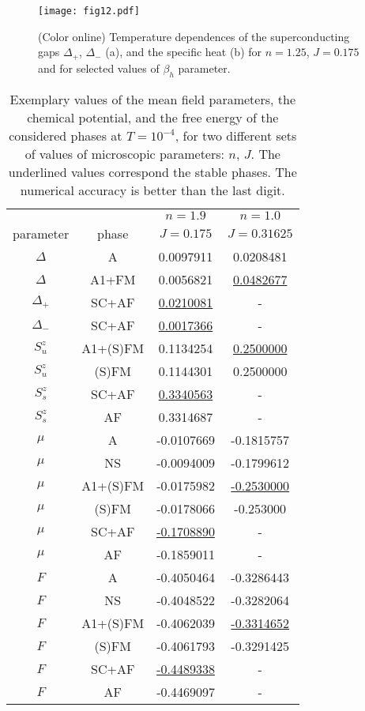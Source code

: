 \documentclass[aps,prb,showpacs,reprint]{revtex4-1}
\begin{document}
\begin{figure}[htpb]
\texttt{[image: fig12.pdf]} 
\caption{(Color online) Temperature dependences of the superconducting gaps $\Delta_+$,
$\Delta_-$ (a), and the specific heat (b) for $n=1.25$, $J=0.175$ and for
selected
values of $\beta_h$ parameter.}
\label{fig:D_c_A}
\end{figure}

\begin{table}[h]
\centering
\caption{Exemplary values of the mean field parameters, the chemical potential,
and the free energy
of the considered phases at $T=10^{-4}$, for two different sets of values of
microscopic parameters: $n$, $J$. The
underlined values correspond the stable phases. The numerical accuracy is better than the last digit.}
 \begin{tabular}{cccc}
  \hline\hline
             &       &  $n=1.9$ & $n=1.0$ \\ 
   parameter & phase &  $J=0.175$ & $J=0.31625$ \\
  \hline
  $\Delta$   &   A   & 0.0097911 & 0.0208481 \\
  $\Delta$   & A1+FM & 0.0056821 & \underline{0.0482677} \\
  $\Delta_+$ & SC+AF & \underline{0.0210081} &     -      \\
  $\Delta_-$ & SC+AF & \underline{0.0017366} &     -     \\
  \hline
  $S^z_u$    &A1+(S)FM& 0.1134254 & \underline{0.2500000}  \\
  $S^z_u$    & (S)FM  & 0.1144301 & 0.2500000  \\
  $S^z_s$    &  SC+AF & \underline{0.3340563} &     -     \\
  $S^z_s$    &   AF   & 0.3314687 &     -     \\
  \hline
  $\mu$     &    A    & -0.0107669& -0.1815757 \\
  $\mu$     &   NS    &-0.0094009 & -0.1799612 \\
  $\mu$     &A1+(S)FM &-0.0175982 & \underline{-0.2530000} \\
  $\mu$     &  (S)FM  &-0.0178066 & -0.253000   \\
  $\mu$     &  SC+AF  &\underline{-0.1708890} & -           \\
  $\mu$     &   AF    &-0.1859011 & -          \\
  \hline
  $F$       &    A    &-0.4050464 & -0.3286443 \\
  $F$       &   NS    &-0.4048522 & -0.3282064 \\
  $F$       &A1+(S)FM &-0.4062039 & \underline{-0.3314652}\\
  $F$       &  (S)FM  &-0.4061793 & -0.3291425 \\
  $F$       &  SC+AF  &\underline{-0.4489338} & -          \\
  $F$       &   AF    &-0.4469097 & -         \\
  \hline\hline
 \end{tabular}
 \label{table: values_tab}
\end{table}
\end{document}
